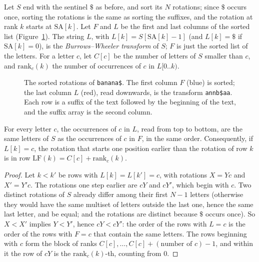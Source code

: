 Let $S$ end with the sentinel $\$$ as before, and sort its $N$ rotations; since $\$$ occurs once, sorting the rotations is the same as sorting the suffixes, and the rotation at rank $k$ starts at $\mathrm{SA}[k]$. Let $F$ and $L$ be the first and last columns of the sorted list (Figure~\ref{fig:bwt}). The string $L$, with $L[k]=S[\mathrm{SA}[k]-1]$ (and $L[k]=\$$ if $\mathrm{SA}[k]=0$), is the \emph{Burrows--Wheeler transform} of $S$; $F$ is just the sorted list of the letters.
For a letter $c$, let $C[c]$ be the number of letters of $S$ smaller than $c$, and $\mathrm{rank}_c(k)$ the number of occurrences of $c$ in $L[0..k)$.

\begin{figure}[ht]
\centering
{}
\caption{The sorted rotations of \texttt{banana\$}. The first column $F$ (blue) is sorted; the last column $L$ (red), read downwards, is the transform \texttt{annb\$aa}. Each row is a suffix of the text followed by the beginning of the text, and the suffix array is the second column.}
\label{fig:bwt}
\end{figure}

\begin{lemma}\label{lem:lf}
For every letter $c$, the occurrences of $c$ in $L$, read from top to bottom, are the same letters of $S$ as the occurrences of $c$ in $F$, in the same order. Consequently, if $L[k]=c$, the rotation that starts one position earlier than the rotation of row $k$ is in row $\mathrm{LF}(k)=C[c]+\mathrm{rank}_c(k)$.
\end{lemma}
\begin{proof}
Let $k<k'$ be rows with $L[k]=L[k']=c$, with rotations $X=Yc$ and $X'=Y'c$. The rotations one step earlier are $cY$ and $cY'$, which begin with $c$. Two distinct rotations of $S$ already differ among their first $N-1$ letters (otherwise they would have the same multiset of letters outside the last one, hence the same last letter, and be equal; and the rotations are distinct because $\$$ occurs once). So $X<X'$ implies $Y<Y'$, hence $cY<cY'$:
the order of the rows with $L=c$ is the order of the rows with $F=c$ that contain the same letters. The rows beginning with $c$ form the block of ranks $C[c],\dots,C[c]+(\text{number of }c)-1$, and within it the row of $cY$ is the $\mathrm{rank}_c(k)$-th, counting from $0$.
\end{proof}

